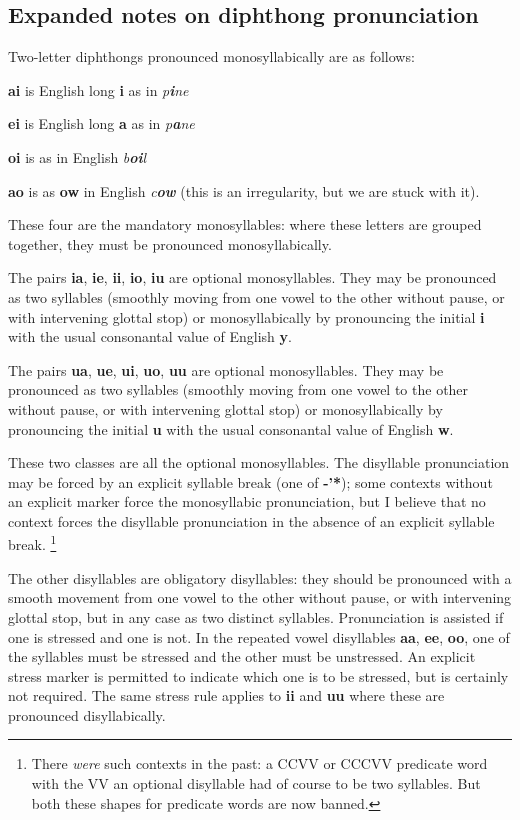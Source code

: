\documentclass[12pt]{book}
\begin{document}
\subsection{Expanded notes on diphthong pronunciation}

Two-letter diphthongs pronounced monosyllabically are as follows:

{\bf ai} is English long {\bf i} as in {\em p{\bf i}ne\/}

{\bf ei} is English long {\bf a} as in {\em p{\bf a}ne\/}

{\bf oi} is as in English {\em b{\bf oi}l\/}

{\bf ao} is as {\bf ow} in English {\em c{\bf ow}\/}  (this is an irregularity, but we are stuck with it).

These four are the mandatory monosyllables:  where these letters are grouped together, they must be pronounced monosyllabically.

The pairs {\bf ia}, {\bf ie}, {\bf ii}, {\bf io}, {\bf iu} are optional monosyllables.  They may be pronounced as two syllables (smoothly moving from one vowel to the other without pause, or with intervening glottal stop)
or monosyllabically by pronouncing the initial {\bf i} with the usual consonantal value of English {\bf y}.

The pairs {\bf ua}, {\bf ue}, {\bf ui}, {\bf uo}, {\bf uu} are optional monosyllables.  They may be pronounced as two syllables (smoothly moving from one vowel to the other without pause, or with intervening glottal stop)
or monosyllabically by pronouncing the initial {\bf u} with the usual consonantal value of English {\bf w}.

These two classes are all the optional monosyllables.  The disyllable pronunciation may be forced by an explicit syllable break (one of {\bf -'*}); some contexts without an explicit marker force the monosyllabic pronunciation, but I believe that no context forces the disyllable pronunciation in the absence of an explicit syllable break.  \footnote{There {\em were\/} such contexts in the past:  a CCVV or CCCVV predicate word with the VV an optional disyllable had of course to be two syllables.  But both these shapes for predicate words are now banned.}


The other disyllables are obligatory disyllables:  they should be pronounced with a smooth movement from one vowel to the other without pause, or with intervening glottal stop, but in any case as two distinct syllables.   Pronunciation is assisted if one is stressed and one is not.   In the repeated vowel disyllables {\bf aa}, {\bf ee}, {\bf oo}, one of the syllables must be stressed and the other must be unstressed.  An explicit stress marker is permitted to indicate which one is to be stressed, but is certainly not required.  The same stress rule applies to {\bf ii} and {\bf uu} where these are pronounced disyllabically.  
\end{document}
